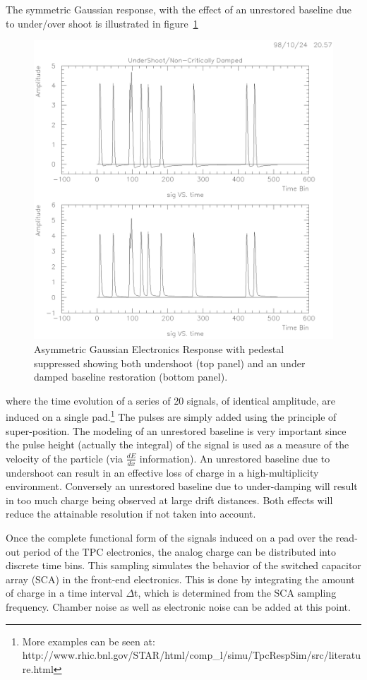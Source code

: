 \documentclass[twoside]{article}
\begin{document}
The symmetric Gaussian response, with the effect of an unrestored baseline
due to under/over shoot is illustrated in figure~\ref{fig:baseline}
\begin{figure}[htb]
\begin{center}
\includegraphics[bbllx=14pt,bblly=137pt,bburx=569pt,bbury=701pt,width=.55\textwidth]{./pics/baseline.ps}
\caption{Asymmetric Gaussian Electronics Response with pedestal suppressed
  showing both undershoot (top panel) and an under damped
  baseline restoration (bottom panel).}
\label{fig:baseline}
\end{center}
\end{figure}
where the time evolution of a series of 20 signals, of identical
amplitude, are induced on a single pad.\footnote{More examples can
  be seen at: http://www.rhic.bnl.gov/STAR/html/comp\_l/simu/TpcRespSim/src/literature.html} 
The pulses are simply added using the principle of super-position.
The modeling of an unrestored baseline is very
important since the pulse height (actually the integral) of the
signal is used as a measure of the velocity of the particle
(via $\frac{dE}{dx}$ information).
An unrestored baseline due to undershoot can result in
an effective loss of charge in a high-multiplicity environment.  Conversely
an unrestored baseline due to under-damping will result in too much
charge being observed at large drift distances.  Both effects
will reduce the attainable resolution if not taken into account.  

Once the complete functional form of the signals induced on a pad
over the read-out period of the TPC electronics, the analog charge
can be distributed into discrete time bins. This sampling simulates
the behavior of the switched capacitor array (SCA) in the front-end
electronics.  This is done by integrating the amount of charge in
a time interval $\Delta$t, which is determined from the SCA sampling
frequency.  Chamber noise as well as electronic noise
can be added at this point.
\end{document}
